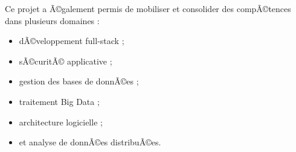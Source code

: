 ﻿\documentclass[12pt,a4paper]{report}
\begin{document}
Ce projet a Ã©galement permis de mobiliser et consolider des compÃ©tences dans plusieurs domaines :
\begin{itemize}
    \item dÃ©veloppement full-stack ;
    \item sÃ©curitÃ© applicative ;
    \item gestion des bases de donnÃ©es ;
    \item traitement Big Data ;
    \item architecture logicielle ;
    \item et analyse de donnÃ©es distribuÃ©es.
\end{itemize}
\end{document}
